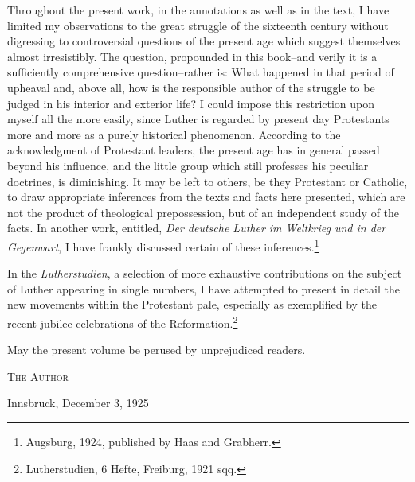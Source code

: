 Throughout the present work, in the annotations as well as in the text,
I have limited my observations to the great struggle of the sixteenth century
without digressing to controversial questions of the
present age which suggest themselves almost irresistibly. The question,
propounded in this book--and verily it is a sufficiently comprehensive question--rather is:
What happened in that period of upheaval
and, above all, how is the responsible author of the struggle to be
judged in his interior and exterior life? I could impose this restriction
upon myself all the more easily, since Luther is regarded by present day
Protestants more and more as a purely historical phenomenon.
According to the acknowledgment of Protestant leaders, the present
age has in general passed beyond his influence, and the little group
which still professes his peculiar doctrines, is diminishing. It may be
left to others, be they Protestant or Catholic, to draw appropriate inferences from the texts and facts here presented, which are not the
product of theological prepossession, but of an independent study of
the facts. In another work, entitled, \textit{Der deutsche Luther im Weltkrieg und in der Gegenwart}, I have frankly discussed certain of these inferences.\footnote{Augsburg, 1924, published by Haas and Grabherr.}

In the \textit{Lutherstudien}, a selection of more exhaustive contributions on the subject of Luther appearing in single numbers, I have attempted to present in detail the new movements within the Protestant pale, especially as exemplified by the recent jubilee celebrations of
the Reformation.\footnote{Lutherstudien, 6 Hefte, Freiburg, 1921 sqq.}

May the present volume be perused by unprejudiced readers.

\hfill \textsc{The Author}

\begin{flushleft}
Innsbruck, December 3, 1925
\end{flushleft}

